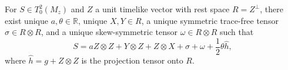 For $S \in T_0^2(M_z)$ and $Z$ a unit timelike vector with rest space $R = Z^\perp$, there exist unique $a, \theta \in \mathbb{R}$, unique $X, Y \in R$, a unique symmetric trace-free tensor $\sigma \in R \otimes R$, and a unique skew-symmetric tensor $\omega \in R \otimes R$ such that
$$S = a Z \otimes Z + Y \otimes Z + Z \otimes X + \sigma + \omega + \frac{1}{2}\theta \hat{h},$$
where $\hat{h} = g + Z \otimes Z$ is the projection tensor onto $R$.